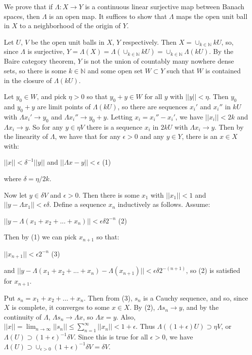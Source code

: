 \documentclass[12pt]{article}
\begin{document}
We prove that if $\Lambda:X \rightarrow Y$ is a continuous linear surjective map between Banach spaces, then $\Lambda$ is an open map.  It suffices to show that $\Lambda$ maps the open unit ball in $X$ to a neighborhood of the origin of $Y$.

Let $U$, $V$ be the open unit balls in $X$, $Y$ respectively.  Then $X=\cup_{k \in \mathbb{N}} kU$, so, since $\Lambda$ is surjective, $Y=\Lambda(X)=\Lambda(\cup_{k \in \mathbb{N}} kU)=\cup_{k \in \mathbb{N}} \Lambda(kU)$.  By the Baire category theorem, $Y$ is not the union of countably many nowhere dense sets, so there is some $k \in \mathbb{N}$ and some open set $W \subset Y$ such that $W$ is contained in the closure of $\Lambda(kU)$.  

Let $y_0 \in W$, and pick $\eta>0$ so that $y_0+y \in W$ for all $y$ with $||y||<\eta$.  Then $y_0$ and $y_0+y$ are limit points of $\Lambda(kU)$, so there are sequences ${x_i'}$ and ${x_i''}$ in $kU$ with $\Lambda x_i' \rightarrow y_0$ and $\Lambda x_i'' \rightarrow y_0+y$.  Letting $x_i=x_i''-x_i'$, we have $||x_i|| < 2k$ and $\Lambda x_i \rightarrow y$.  So for any $y \in \eta V$ there is a sequence ${x_i}$ in $2kU$ with $\Lambda x_i \rightarrow y$.  Then by the linearity of $\Lambda$, we have that for any $\epsilon>0$ and any $y \in Y$, there is an $x \in X$ with:

$||x||< \delta^{-1} ||y||$ \mbox{and} $||\Lambda x -y||<\epsilon $ (1)

where $\delta=\eta/2k$.

Now let $y \in \delta V$ and $\epsilon>0$.  Then there is some $x_1$ with $||x_1||< 1$ and $||y-\Lambda x_1||<\epsilon \delta$.  Define a sequence ${x_n}$ inductively as follows.  Assume:

$ ||y-\Lambda(x_1+x_2+...+x_n)||<\epsilon \delta 2^{-n} $ (2)

Then by (1) we can pick $x_{n+1}$ so that:

$||x_{n+1}||< \epsilon 2^{-n}$ (3)

and $||y-\Lambda(x_1+x_2+...+x_n) - \Lambda(x_{n+1})||<\epsilon \delta 2^{-(n+1)}$, so (2) is satisfied for $x_{n+1}$.

Put $s_n=x_1+x_2+...+x_n$.  Then from (3), $s_n$ is a Cauchy sequence, and so, since $X$ is complete, it converges to some $x \in X$.  By (2), $\Lambda s_n \rightarrow y$, and by the continuity of $\Lambda$, $\Lambda s_n \rightarrow \Lambda x$, so $\Lambda x= y$.  Also, $||x||=\lim_{n \rightarrow \infty} ||s_n|| \leq \sum_{n=1}^\infty ||x_n|| < 1+\epsilon$.  Thus $\Lambda((1+\epsilon)U) \supset \eta V$, or $\Lambda(U) \supset (1+\epsilon)^{-1} \delta V$.  Since this is true for all $\epsilon>0$, we have $\Lambda(U) \supset \cup_{\epsilon>0} (1+\epsilon)^{-1} \delta V = \delta V$.
\end{document}
